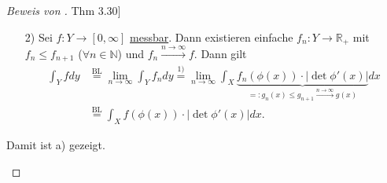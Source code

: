 \documentclass[a4paper]{scrreprt}
\newcommand{\doubleOne}{\textbf{1}}
\newcommand{\R}{\mathbb{R}}
\newcommand{\N}{\mathbb{N}}
\newcommand{\Borel}{\mathcal{B}}
\newcommand{\toInf}{\rightarrow \infty}
\newcommand{\limToInf}[1]{\lim_{#1 \toInf}}
\newcommand{\jshortlink}[1]{\jhyperref{#1}{\text{#1}}}
\newcommand{\jhyperref}[2]{\hyperref[j_#1]{#2}}
\newcommand{\jlink}[1]{\jhyperref{#1}{#1}}
\newcommand{\jabb}[3]{ #1: #2 \rightarrow #3 }
\theoremstyle{plain}
\theoremstyle{definition}
\begin{document}
{{{{\begin{proof}[Beweis von \jlink{Thm 3.30}]
\begin{enumerate}
\begin{itemize}
                    Sei $f\ge 0$ einfach mit $f=\sum_{k=1}^m z_k\cdot \doubleOne_{B_k}$, $B_k\in \Borel(Y)$. Da $\phi$ stetig ist, folgt $\phi^{-1}(B_k) =: A_k \in \Borel(X) \ \forall k\in \N$. Weiter ist $B_k = \phi(A_k)$ und es gilt für alle $x\in X, k=1,\dots,m$
                    \[
                        \doubleOne_{A_k}(x) = \begin{cases}
                                                1, & x\in A_k\\
                                                0, & x\notin A_k
                                            \end{cases}
                                            = \begin{cases}
                                                1, &\phi(x) \in \Borel_k\\
                                                0, &\phi(x) \notin \Borel_k
                                            \end{cases}
                                            = \doubleOne_{B_k}(\phi(x)).
                    \]
                    Damit gilt
                    \[
                        \begin{split}
                            \int_Y f dy &= \sum_{k=1}^m z_k\cdot \int_Y \doubleOne_{B_k} dy \overset{\text{s.o.}}{=} \sum_{k=1}^m z_k\cdot \lambda(\phi(A_k))\\
                                        &\overset{\jshortlink{Lem 3.32}}{=} \sum_{k=1}^m z_k \cdot \int_{A_k} |\det \phi'(x)|dx\\
                                        &= \int_X \sum_{k=1}^m z_k\cdot \underbrace{\doubleOne_{A_k}(x)}_{=\doubleOne_{B_k}(\phi(x))}\cdot |\det \phi'(x)|dx\\
                                        &= \int_X f(\phi(x))\cdot |\det \phi(x)|dx.
                        \end{split}
                    \]
                
                \item[2)]
                    Sei $\jabb{f}{Y}{[0,\infty]}$ \jlink{messbar}. Dann existieren einfache $\jabb{f_n}{Y}{\R_+}$ mit $f_n \le f_{n+1}$ ($\forall n\in\N$) und $f_n \xrightarrow{n\rightarrow\infty} f$. Dann gilt
                    \[
                        \begin{split}
                            \int_Y f dy &\overset{\jshortlink{BL}}{=} \limToInf{n} \int_Y f_n dy \overset{1)}{=} \limToInf{n} \int_X \underbrace{f_n(\phi(x))\cdot |\det \phi'(x)|}_{=:g_n(x) \le g_{n+1} \xrightarrow{n\rightarrow\infty} g(x)} dx\\
                            &\overset{\jshortlink{BL}}{=} \int_Xf(\phi(x))\cdot |\det \phi'(x)|dx.
                        \end{split}
                    \]
            \end{itemize}
            Damit ist a) gezeigt.
            

\end{enumerate}
\end{proof}}}}}
\end{document}

